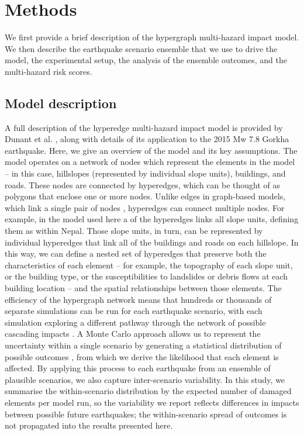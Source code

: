 \documentclass[preprint,12pt,authoryear]{elsarticle}
\begin{document}
\section{Methods}
We first provide a brief description of the hypergraph multi-hazard impact model. We then describe the earthquake scenario ensemble that we use to drive the model, the experimental setup, the analysis of the ensemble outcomes, and the multi-hazard risk scores.

\subsection{Model description}

A full description of the hyperedge multi-hazard impact model is provided by Dunant et al. \citep{Dunant2025}, along with details of its application to the 2015 Mw 7.8 Gorkha earthquake. Here, we give an overview of the model and its key assumptions. The model operates on a network of nodes which represent the elements in the model -- in this case, hillslopes (represented by individual slope units), buildings, and roads. These nodes are connected by hyperedges, which can be thought of as polygons that enclose one or more nodes. Unlike edges in graph-based models, which link a single pair of nodes \citep{Dunant2021}, hyperedges can connect multiple nodes. For example, in the model used here a of the hyperedges  links all slope units, defining them as within Nepal. Those slope units, in turn, can be represented by individual hyperedges that link all of the buildings and roads on each hillslope. In this way, we can define a nested set of hyperedges that preserve both the characteristics of each element -- for example, the topography of each slope unit, or the building type, or the susceptibilities to landslides or debris flows at each building location -- and the spatial relationships between those elements. The efficiency of the hypergraph network means that hundreds or thousands of separate simulations can be run for each earthquake scenario, with each simulation exploring a different pathway through the network of possible cascading impacts \citep{Dunant2025}. A Monte Carlo approach allows us to represent the uncertainty within a single scenario by generating a statistical distribution of possible outcomes \citep{dunant2021multihazards}, from which we derive the likelihood that each element is affected. By applying this process to each earthquake from an ensemble of plausible scenarios, we also capture inter-scenario variability. In this study, we summarise the within-scenario distribution by the expected number of damaged elements per model run, so the variability we report reflects differences in impacts between possible future earthquakes; the within-scenario spread of outcomes is not propagated into the results presented here.
\end{document}
